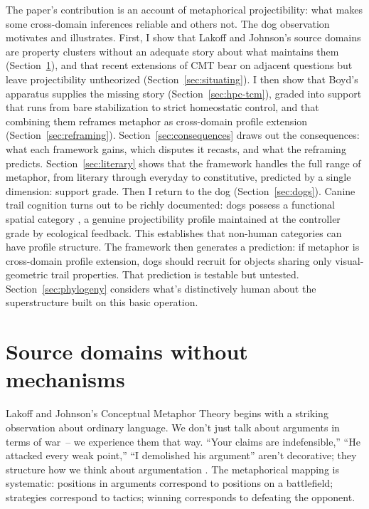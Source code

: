 \documentclass[12pt]{article}
\begin{document}
The paper's contribution is an account of metaphorical projectibility: what makes some cross-domain inferences reliable and others not. The dog observation motivates and illustrates. First, I show that Lakoff and Johnson's source domains are property clusters without an adequate story about what maintains them (Section~\ref{sec:source-domains}), and that recent extensions of CMT bear on adjacent questions but leave projectibility untheorized (Section~\ref{sec:situating}). I then show that Boyd's apparatus supplies the missing story (Section~\ref{sec:hpc-tcm}), graded into support that runs from bare stabilization to strict homeostatic control, and that combining them reframes metaphor as cross-domain profile extension (Section~\ref{sec:reframing}). Section~\ref{sec:consequences} draws out the consequences: what each framework gains, which disputes it recasts, and what the reframing predicts. Section~\ref{sec:literary} shows that the framework handles the full range of metaphor, from literary through everyday to constitutive, predicted by a single dimension: support grade. Then I return to the dog (Section~\ref{sec:dogs}). Canine trail cognition turns out to be richly documented: dogs possess a functional spatial category , a genuine projectibility profile maintained at the controller grade by ecological feedback. This establishes that non-human categories can have profile structure. The framework then generates a prediction: if metaphor is cross-domain profile extension, dogs should recruit  for objects sharing only visual-geometric trail properties. That prediction is testable but untested. Section~\ref{sec:phylogeny} considers what's distinctively human about the superstructure built on this basic operation.

\section{Source domains without mechanisms}
\label{sec:source-domains}

Lakoff and Johnson's Conceptual Metaphor Theory begins with a striking observation about ordinary language. We don't just talk about arguments in terms of war~-- we experience them that way. \enquote{Your claims are indefensible,} \enquote{He attacked every weak point,} \enquote{I demolished his argument} aren't decorative; they structure how we think about argumentation \citep[4]{lakoff1980}. The metaphorical mapping is systematic: positions in arguments correspond to positions on a battlefield; strategies correspond to tactics; winning corresponds to defeating the opponent.
\end{document}
